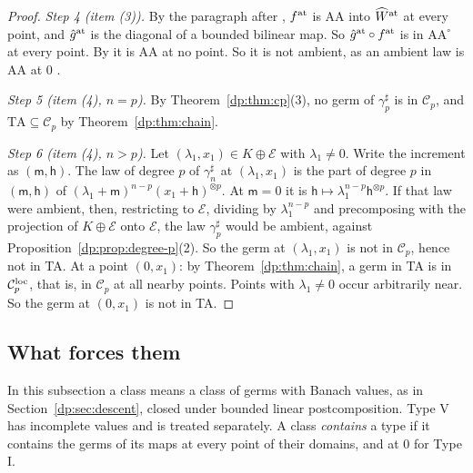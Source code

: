 \documentclass[11pt]{amsart}
\theoremstyle{definition}
\theoremstyle{remark}
\numberwithin{equation}{section}
\newcommand{\cC}{\mathcal{C}}
\theoremstyle{plain}
\theoremstyle{definition}
\theoremstyle{plain}
\begin{document}
\begin{proof}
\emph{Step 4 (item (3)).} By the paragraph after \cite[Theorem~14.17]{I}, $f^{\rm at}$ is AA into $\widehat W^{\rm at}$ at every point, and $\hat g^{\rm at}$ is the diagonal of a bounded bilinear map. So $\hat g^{\rm at}\circ f^{\rm at}$ is in $\mathrm{AA}^\circ$ at every point. By \cite[Theorem~14.17]{I} it is AA at no point. So it is not ambient, as an ambient law is AA at $0$ \cite[Proposition~14.9(1)]{I}.

\emph{Step 5 (item (4), $n=p$).} By Theorem~\ref{dp:thm:cp}(3), no germ of $\gamma^\sharp_p$ is in $\cC_p$, and $\mathrm{TA}\subseteq\cC_p$ by Theorem~\ref{dp:thm:chain}.

\emph{Step 6 (item (4), $n>p$).} Let $(\lambda_1,x_1)\in K\oplus\mathcal E$ with $\lambda_1\ne0$. Write the increment as $(\mathsf m,\mathsf h)$. The law of degree $p$ of $\gamma^\sharp_n$ at $(\lambda_1,x_1)$ is the part of degree $p$ in $(\mathsf m,\mathsf h)$ of $(\lambda_1+\mathsf m)^{n-p}(x_1+\mathsf h)^{\otimes p}$. At $\mathsf m=0$ it is $\mathsf h\mapsto\lambda_1^{n-p}\mathsf h^{\otimes p}$. If that law were ambient, then, restricting to $\mathcal E$, dividing by $\lambda_1^{n-p}$ and precomposing with the projection of $K\oplus\mathcal E$ onto $\mathcal E$, the law $\gamma^\sharp_p$ would be ambient, against Proposition~\ref{dp:prop:degree-p}(2). So the germ at $(\lambda_1,x_1)$ is not in $\cC_p$, hence not in TA. At a point $(0,x_1)$: by Theorem~\ref{dp:thm:chain}, a germ in TA is in $\cC_p^{\rm loc}$, that is, in $\cC_p$ at all nearby points. Points with $\lambda_1\ne0$ occur arbitrarily near. So the germ at $(0,x_1)$ is not in TA.
\end{proof}

\subsection{What forces them}\label{dp:ssec:forcing}

In this subsection a class means a class of germs with Banach values, as in Section~\ref{dp:sec:descent}, closed under bounded linear postcomposition. Type V has incomplete values and is treated separately. A class \emph{contains} a type if it contains the germs of its maps at every point of their domains, and at $0$ for Type I.
\end{document}
